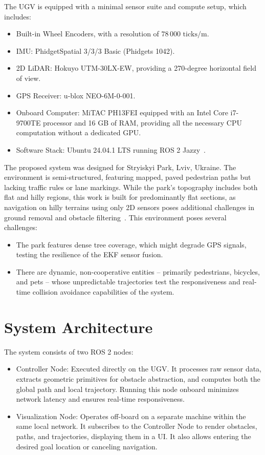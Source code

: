 The UGV is equipped with a minimal sensor suite and compute setup, which includes:
\begin{itemize}
    \item Built-in Wheel Encoders, with a resolution of $78\,000\text{ ticks/m}$.
    \item IMU: PhidgetSpatial 3/3/3 Basic (Phidgets 1042).
    \item 2D LiDAR: Hokuyo UTM-30LX-EW, providing a 270-degree horizontal field of view.
    \item GPS Receiver: u-blox NEO-6M-0-001.
    \item Onboard Computer: MiTAC PH13FEI equipped with an Intel Core i7-9700TE processor and 16 GB of RAM, providing all the necessary CPU computation without a dedicated GPU.
    \item Software Stack: Ubuntu 24.04.1 LTS running ROS 2 Jazzy~\cite{macenski2022ros2}.
\end{itemize}

The proposed system was designed for Stryiskyi Park, Lviv, Ukraine. The environment is semi-structured, featuring mapped, paved pedestrian paths but lacking traffic rules or lane markings. While the park's topography includes both flat and hilly regions, this work is built for predominantly flat sections, as navigation on hilly terrains using only 2D sensors poses additional challenges in ground removal and obstacle filtering~\cite{kim2020hilly}. This environment poses several challenges:
\begin{itemize}
    \item The park features dense tree coverage, which might degrade GPS signals, testing the resilience of the EKF sensor fusion.
    \item There are dynamic, non-cooperative entities -- primarily pedestrians, bicycles, and pets -- whose unpredictable trajectories test the responsiveness and real-time collision avoidance capabilities of the system.
\end{itemize}

\section{System Architecture}
\label{sec:system-architecture}

The system consists of two ROS 2 nodes:
\begin{itemize}
    \item Controller Node: Executed directly on the UGV. It processes raw sensor data, extracts geometric primitives for obstacle abstraction, and computes both the global path and local trajectory. Running this node onboard minimizes network latency and ensures real-time responsiveness.
    \item Visualization Node: Operates off-board on a separate machine within the same local network. It subscribes to the Controller Node to render obstacles, paths, and trajectories, displaying them in a UI. It also allows entering the desired goal location or canceling navigation.
\end{itemize}

